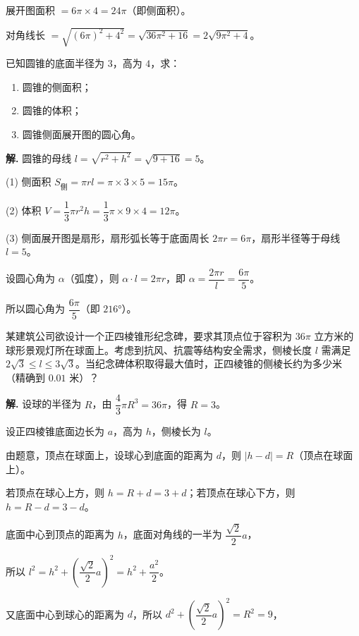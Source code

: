 \documentclass[11pt]{ctexrep}
\begin{document}
展开图面积 $= 6\pi \times 4 = 24\pi$（即侧面积）。

对角线长 $= \sqrt{(6\pi)^2 + 4^2} = \sqrt{36\pi^2 + 16} = 2\sqrt{9\pi^2 + 4}$。

\begin{example}[圆锥的计算]
    已知圆锥的底面半径为 $3$，高为 $4$，求：
    \begin{enumerate}
        \item 圆锥的侧面积；
        \item 圆锥的体积；
        \item 圆锥侧面展开图的圆心角。
    \end{enumerate}
\end{example}

\textbf{解.} 圆锥的母线 $l = \sqrt{r^2 + h^2} = \sqrt{9 + 16} = 5$。

(1) 侧面积 $S_{\text{侧}} = \pi rl = \pi \times 3 \times 5 = 15\pi$。

(2) 体积 $V = \dfrac{1}{3}\pi r^2 h = \dfrac{1}{3}\pi \times 9 \times 4 = 12\pi$。

(3) 侧面展开图是扇形，扇形弧长等于底面周长 $2\pi r = 6\pi$，扇形半径等于母线 $l = 5$。

设圆心角为 $\alpha$（弧度），则 $\alpha \cdot l = 2\pi r$，即 $\alpha = \dfrac{2\pi r}{l} = \dfrac{6\pi}{5}$。

所以圆心角为 $\dfrac{6\pi}{5}$（即 $216°$）。

\begin{realexam}[2023 上海秋考]
    某建筑公司欲设计一个正四棱锥形纪念碑，要求其顶点位于容积为 $36\pi$ 立方米的球形景观灯所在球面上。考虑到抗风、抗震等结构安全需求，侧棱长度 $l$ 需满足 $2\sqrt{3} \leq l \leq 3\sqrt{3}$。当纪念碑体积取得最大值时，正四棱锥的侧棱长约为多少米（精确到 $0.01$ 米）？
\end{realexam}

\textbf{解.} 设球的半径为 $R$，由 $\dfrac{4}{3}\pi R^3 = 36\pi$，得 $R = 3$。

设正四棱锥底面边长为 $a$，高为 $h$，侧棱长为 $l$。

由题意，顶点在球面上，设球心到底面的距离为 $d$，则 $|h - d| = R$（顶点在球面上）。

若顶点在球心上方，则 $h = R + d = 3 + d$；若顶点在球心下方，则 $h = R - d = 3 - d$。

底面中心到顶点的距离为 $h$，底面对角线的一半为 $\dfrac{\sqrt{2}}{2}a$，

所以 $l^2 = h^2 + \left(\dfrac{\sqrt{2}}{2}a\right)^2 = h^2 + \dfrac{a^2}{2}$。

又底面中心到球心的距离为 $d$，所以 $d^2 + \left(\dfrac{\sqrt{2}}{2}a\right)^2 = R^2 = 9$，
\end{document}
